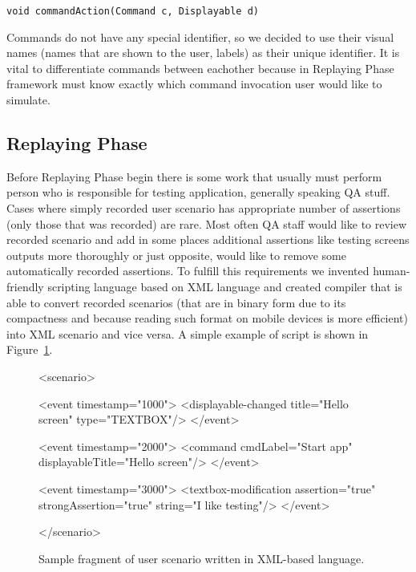 \documentclass[a4paper,10pt,oneside,final]{dweiss-technote}
\begin{document}
\begin{Verbatim}
void commandAction(Command c, Displayable d)
\end{Verbatim}

Commands do not have any special identifier, so we decided to use their visual names (names that are
shown to the user, labels) as their unique identifier. It is vital to differentiate commands between
eachother because in Replaying Phase framework must know exactly which command invocation user would
like to simulate.

\subsection{Replaying Phase}

Before Replaying Phase begin there is some work that usually must perform person who is responsible
for testing application, generally speaking QA stuff. Cases where simply recorded user scenario has
appropriate number of assertions (only those that was recorded) are rare. Most often QA staff would
like to review recorded scenario and add in some places additional assertions like testing screens
outputs more thoroughly or just opposite, would like to remove some automatically recorded
assertions. To fulfill this requirements we invented human-friendly scripting language based on XML
language and created compiler that is able to convert recorded scenarios (that are in binary form
due to its compactness and because reading such format on mobile devices is more efficient) into XML
scenario and vice versa. A simple example of script is shown in Figure~\ref{fig:xmllanguage}.

\begin{figure}
\begin{minipage}[t]{1.0\linewidth}
\begin{codeblock}
<scenario>
    
  <event timestamp="1000">
      <displayable-changed title="Hello screen" type="TEXTBOX"/>
  </event>
    
  <event timestamp="2000">
      <command cmdLabel="Start app" displayableTitle="Hello screen"/>
  </event>
    
  <event timestamp="3000">        
      <textbox-modification assertion="true" strongAssertion="true" string="I like testing"/>
  </event>
    
</scenario>
\end{codeblock}
\end{minipage}
\caption{Sample fragment of user scenario written in XML-based language.}\label{fig:xmllanguage}
\end{figure}
\end{document}
